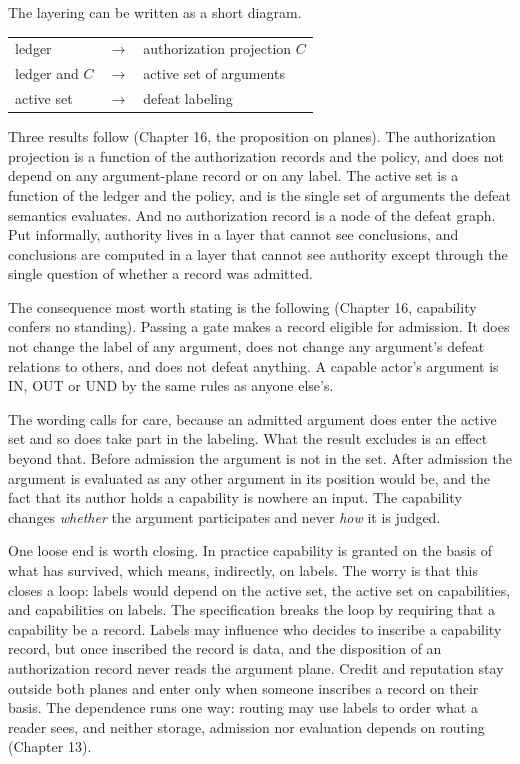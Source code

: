 \documentclass[11pt]{article}
\newcommand{\IN}{\textsf{IN}}
\newcommand{\UND}{\textsf{UND}}
\newcommand{\OUT}{\textsf{OUT}}
\begin{document}
The layering can be written as a short diagram.
\begin{center}
\small
\begin{tabular}{@{}l@{\;}c@{\;}l@{}}
ledger & $\longrightarrow$ & authorization projection $C$\\
ledger and $C$ & $\longrightarrow$ & active set of arguments\\
active set & $\longrightarrow$ & defeat labeling
\end{tabular}
\end{center}

Three results follow (Chapter 16, the proposition on planes). The authorization projection is a function of the authorization records and the policy, and does not depend on any argument-plane record or on any label. The active set is a function of the ledger and the policy, and is the single set of arguments the defeat semantics evaluates. And no authorization record is a node of the defeat graph. Put informally, authority lives in a layer that cannot see conclusions, and conclusions are computed in a layer that cannot see authority except through the single question of whether a record was admitted.

The consequence most worth stating is the following (Chapter 16, capability confers no standing). Passing a gate makes a record eligible for admission. It does not change the label of any argument, does not change any argument's defeat relations to others, and does not defeat anything. A capable actor's argument is \IN{}, \OUT{} or \UND{} by the same rules as anyone else's.

The wording calls for care, because an admitted argument does enter the active set and so does take part in the labeling. What the result excludes is an effect beyond that. Before admission the argument is not in the set. After admission the argument is evaluated as any other argument in its position would be, and the fact that its author holds a capability is nowhere an input. The capability changes \emph{whether} the argument participates and never \emph{how} it is judged.

One loose end is worth closing. In practice capability is granted on the basis of what has survived, which means, indirectly, on labels. The worry is that this closes a loop: labels would depend on the active set, the active set on capabilities, and capabilities on labels. The specification breaks the loop by requiring that a capability be a record. Labels may influence who decides to inscribe a capability record, but once inscribed the record is data, and the disposition of an authorization record never reads the argument plane. Credit and reputation stay outside both planes and enter only when someone inscribes a record on their basis. The dependence runs one way: routing may use labels to order what a reader sees, and neither storage, admission nor evaluation depends on routing (Chapter 13).
\end{document}
